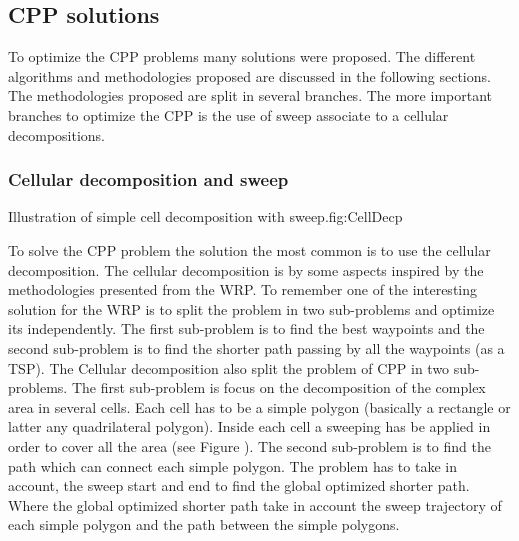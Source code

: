 \subsection{CPP solutions}



To optimize the CPP problems many solutions were proposed. The different algorithms and methodologies proposed are discussed in the following sections. The methodologies proposed are  split in several branches. 
The more important branches to optimize the CPP is the use of sweep associate to a cellular decompositions.
%
%

\subsubsection{Cellular decomposition and sweep} \label{sec:CPPcellDecompSol}
\begin{mfigures}[!]{Illustration  of  simple cell decomposition with sweep.}{fig:CellDecp} \centering
{}

\end{mfigures}	
To solve the CPP problem the solution the most common is to use the cellular decomposition. The cellular decomposition is by some aspects inspired by the methodologies presented from the WRP.
To remember one of the interesting solution for the WRP  is to split the problem in two sub-problems and optimize its independently. The first sub-problem is to find the best waypoints and the second sub-problem is to find the shorter path passing by all the waypoints (as a TSP).
 The Cellular decomposition also split the problem of CPP in two sub-problems. The first sub-problem is focus on the decomposition of the complex area in several cells. Each cell has to be a simple polygon (basically a rectangle or latter any quadrilateral polygon). Inside each cell a sweeping has be applied in order to cover all the area (see Figure ). The second sub-problem is to find the path which can connect each simple polygon. The problem has to take in account, the sweep start and end to find the global optimized shorter path. Where the global optimized shorter path take in account the sweep trajectory of each simple polygon and the path between the simple polygons.
 
